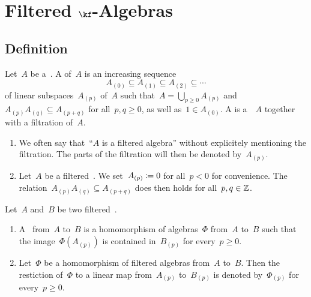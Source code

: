 \section{Filtered \texorpdfstring{$\kf$}{k}-Algebras}



\subsection{Definition}

\begin{definition}
	Let~$A$ be a~\algebra{$\kf$}.
	A  of~$A$ is an increasing sequence
	\[
		A_{(0)}
		\subseteq
		A_{(1)}
		\subseteq
		A_{(2)}
		\subseteq
		\dotsb
	\]
	of linear subspaces~$A_{(p)}$ of~$A$ such that~$A = \bigcup_{p \geq 0} A_{(p)}$ and~$A_{(p)} A_{(q)} \subseteq A_{(p+q)}$ for all~$p, q \geq 0$, as well as~$1 \in A_{(0)}$.
	A  is a~\algebra{$\kf$}~$A$ together with a filtration of~$A$.
\end{definition}


\begin{remark}
	\label{filtration conventions}
	\leavevmode
	\begin{enumerate}
		\item
			We often say that~\enquote{$A$ is a filtered algebra} without explicitely mentioning the filtration.
			The parts of the filtration will then be denoted by~$A_{(p)}$.
		\item
			Let~$A$ be a filtered~\algebra{$\kf$}.
			We set~$A_{(p)} \coloneqq 0$ for all~$p < 0$ for convenience.
			The relation~$A_{(p)} A_{(q)} \subseteq A_{(p+q)}$ does then holds for all~$p, q \in \mathbb{Z}$.
	\end{enumerate}
\end{remark}


\begin{definition}
	Let~$A$ and~$B$ be two filtered~\algebras{$\kf$}.
	\begin{enumerate}
		\item
			A~ from~$A$ to~$B$ is a homomorphism of algebras~$\Phi$ from~$A$ to~$B$ such that the image~$\Phi( A_{(p)} )$ is contained in~$B_{(p)}$ for every~$p \geq 0$.
		\item
			Let~$\Phi$ be a homomorphism of filtered algebras from~$A$ to~$B$.
			Then the restiction of~$\Phi$ to a linear map from~$A_{(p)}$ to~$B_{(p)}$ is denoted by~$\Phi_{(p)}$ for every~$p \geq 0$.
	\end{enumerate}
\end{definition}


